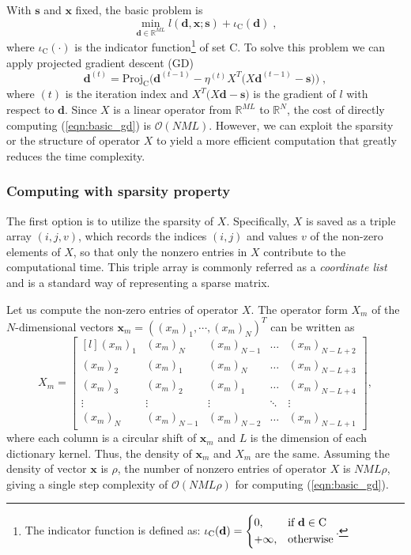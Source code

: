 \documentclass[final]{siamart1116}
\newcommand{\mb}[1]{\mathbf{#1}}
\def \co {\mathcal{O}}
\def \R  {\mathbb{R}}
\begin{document}
With $\mb{s}$ and $\mb{x}$ fixed, the basic problem is
\begin{equation}
\label{eqn:basic}
\min_{\mb{d}\in\R^{ML}} l(\mb{d},\mb{x};\mb{s}) + \iota_{\text{C}}(\mb{d}) \;,
\end{equation}
where $\iota_{\mathrm{C}}(\cdot)$ is the indicator function\footnote{The indicator function is defined as: $\iota_{\mathrm{C}}(\mb{d})=\begin{dcases} 0,& \text{if } \mb{d} \in \text{C}\\     +\infty,              & \text{otherwise}\end{dcases}$.} of set $\mathrm{C}$.
To solve this problem we can apply projected gradient descent (GD)
\cite{bertsekas1999nonlinear}
\begin{equation}
\label{eqn:basic_gd}
\mb{d}^{(t)} = \text{Proj}_{\text{C}}\Big(\mb{d}^{(t-1)} - \eta^{(t)}X^T \big(X \mb{d}^{(t-1)} - \mb{s}\big) \Big)\;,
\end{equation}
where $(t)$ is the iteration index and $ X^T \big(X \mb{d} - \mb{s}\big)$ is the gradient of $l$ with respect to $\mb{d}$.
Since $X$ is a linear operator from $\R^{ML}$ to $\R^{N}$, the cost of directly computing (\ref{eqn:basic_gd}) is $\co(NM
L)$.
However, we can exploit the sparsity or the structure of operator $X$ to yield a more efficient computation that greatly reduces the time complexity.


\subsubsection{Computing with sparsity property}

The first option is to utilize the sparsity of $X$. Specifically, $X$ is saved as a triple array $(i,j,v)$, which records the indices $(i,j)$ and values $v$ of the non-zero elements of $X$, so that only the nonzero entries in $X$ contribute to the computational time. This triple array is commonly referred as a \emph{coordinate list} and is a standard way of representing a sparse matrix.

Let us compute the non-zero entries of operator $X$. The operator form $X_m$ of the $N$-dimensional vectors $\mb{x}_m = ((x_m)_1, \cdots, (x_m)_N)^T$ can be written as
\[X_m =
\begin{bmatrix*}[l]
    (x_m)_1       & (x_m)_N & (x_m)_{N-1} & \dots & (x_m)_{N-L+2} \\
    (x_m)_2      & (x_m)_1 & (x_m)_N & \dots & (x_m)_{N-L+3}  \\
(x_m)_3 &               (x_m)_2 & (x_m)_1 & \dots & (x_m)_{N-L+4}  \\
  \vdots & \vdots & \vdots & \ddots & \vdots \\
    (x_m)_N      & (x_m)_{N-1} & (x_m)_{N-2} & \dots & (x_m)_{N-L+1}
\end{bmatrix*},\]
where each column is a circular shift of $\mb{x}_m$ and $L$ is the dimension of each dictionary kernel. Thus, the density of $\mb{x}_m$ and $X_m$ are the same. Assuming the density of vector $\mb{x}$ is $\rho$, the number of nonzero entries of operator $X$ is $NML\rho$, giving a single step complexity of $\co(NML\rho)$ for computing (\ref{eqn:basic_gd}).
\end{document}
